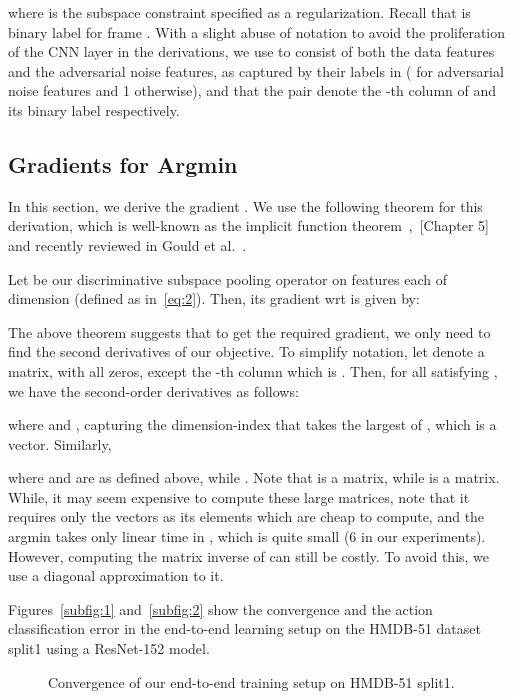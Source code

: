 \documentclass[runningheads]{llncs}
\begin{document}
where  is the subspace constraint specified as a regularization. Recall that  is binary label for frame . With a slight abuse of notation to avoid the proliferation of the CNN layer  in the derivations, we use  to consist of both the data features and the adversarial noise features, as captured by their labels in  ( for adversarial noise features and 1 otherwise), and that the pair  denote the -th column of  and its binary label respectively.



\subsection{Gradients for Argmin}



In this section, we derive the gradient . We use the following theorem for this derivation, which is well-known as the implicit function theorem~\cite{chiang1984fundamental},~\cite{faugeras1993three}[Chapter 5] and recently reviewed in Gould et al.~\cite{gould2016differentiating}. 
\begin{theorem}
Let  be our discriminative subspace pooling operator on  features each of dimension  (defined as in~\eqref{eq:2}). Then, its gradient wrt  is given by:

\label{thm:1}
\end{theorem}

The above theorem suggests that to get the required gradient, we only need to find the second derivatives of our objective. To simplify notation, let  denote a  matrix, with all zeros, except the -th column which is . Then, for all  satisfying , we have the second-order derivatives as follows:

where  and ,  capturing the dimension-index that takes the largest of , which is a  vector. Similarly, 

where  and  are as defined above, while . Note that  is a  matrix, while  is a  matrix. While, it may seem expensive to compute these large matrices, note that it requires only the vectors  as its elements which are cheap to compute, and the argmin takes only linear time in , which is quite small (6 in our experiments). However, computing the matrix inverse of  can still be costly. To avoid this, we use a diagonal approximation to it. 

Figures~\ref{subfig:1} and~\ref{subfig:2} show the convergence and the action classification error in the end-to-end learning setup on the HMDB-51 dataset split1 using a ResNet-152 model.
\begin{figure}[h]
	\begin{center}
	\end{center}
	\caption{Convergence of our end-to-end training setup on HMDB-51 split1.}
\end{figure}
\end{document}
